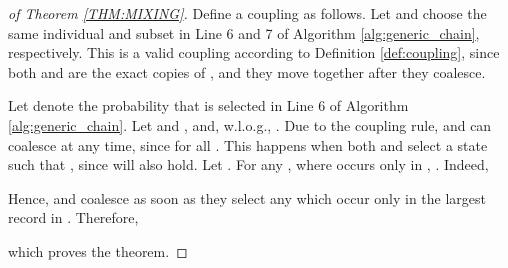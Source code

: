 \documentclass{acm_proc_article-sp}
\theoremstyle{plain}
\theoremstyle{plain}
\theoremstyle{plain}
\theoremstyle{plain}
\theoremstyle{plain}
\theoremstyle{plain}
\begin{document}
\begin{proof}[of Theorem \ref{THM:MIXING}]
Define a coupling  as follows. Let  and  choose the same individual  and subset  in Line 6 and 7 of Algorithm \ref{alg:generic_chain}, respectively. This is a valid coupling according to Definition \ref{def:coupling}, since both  and  are the exact copies of , and they move together after they coalesce.

Let  denote the probability that  is selected in Line 6 of Algorithm \ref{alg:generic_chain}.
Let  and , and, w.l.o.g., . Due to the coupling rule,  and  can coalesce at any time, since  for all . This happens when both  and  select a state  such that , since  will also hold. Let . For any , where  occurs only in , .
Indeed, 


Hence,  and  coalesce as soon as they select any   which occur only in the largest record in . Therefore,

which proves the theorem.
\end{proof}

\balancecolumns
\end{document}
